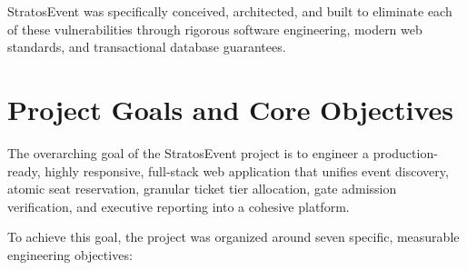 \documentclass[11pt,a4paper]{report}
\begin{document}
StratosEvent was specifically conceived, architected, and built to eliminate each of these vulnerabilities through rigorous software engineering, modern web standards, and transactional database guarantees.

\section{Project Goals and Core Objectives}
\justifying
The overarching goal of the StratosEvent project is to engineer a production-ready, highly responsive, full-stack web application that unifies event discovery, atomic seat reservation, granular ticket tier allocation, gate admission verification, and executive reporting into a cohesive platform.

To achieve this goal, the project was organized around seven specific, measurable engineering objectives:
\end{document}
